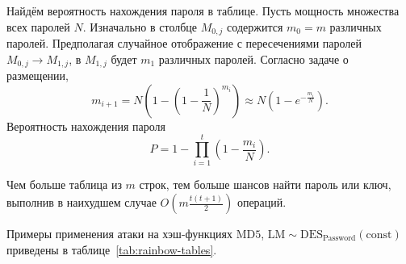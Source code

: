 \documentclass[10pt,a4paper,openany]{book}
\begin{document}
Найдём вероятность нахождения пароля в таблице. Пусть мощность множества всех паролей $N$. Изначально в столбце $M_{0,j}$ содержится $m_0 = m$ различных паролей. Предполагая случайное отображение с пересечениями паролей $M_{0,j} \rightarrow M_{1,j}$, в $M_{1,j}$ будет $m_1$ различных паролей. Согласно задаче о размещении,
\[
    m_{i+1} = N \left( 1 - \left( 1 - \frac{1}{N} \right)^{m_i} \right) \approx N \left( 1 - e^{-\frac{m_i}{N}} \right).
\]
Вероятность нахождения пароля
\[
    P = 1 - \prod \limits_{i=1}^t \left( 1 - \frac{m_i}{N} \right).
\]

Чем больше таблица из $m$ строк, тем больше шансов найти пароль или ключ, выполнив в наихудшем случае   $O \left( m \frac{t(t+1)}{2} \right)$ операций.

Примеры применения атаки на хэш-функциях $\textrm{MD5}$, $\textrm{LM} \sim \textrm{DES}_{\textrm{Password}} (\textrm{const})$ приведены в таблице~\ref{tab:rainbow-tables}.

\begin{table}[!ht]
    \centering
    \caption{Атаки на радужных таблицах на \emph{одном} ПК\label{tab:rainbow-tables}}
\end{table}
\end{document}
